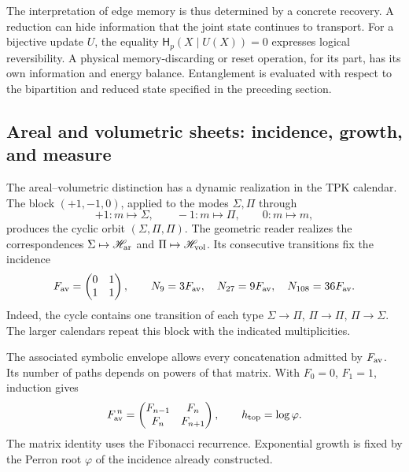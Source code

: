 The interpretation of edge memory is thus determined by
a concrete recovery. A reduction can hide information
that the joint state continues to transport. For a bijective update
\(U\), the equality \(\mathsf H_p(X\mid U(X))=0\) expresses
logical reversibility. A physical memory-discarding or reset
operation, for its part, has its own information and energy
balance. Entanglement is evaluated with respect to the bipartition and
reduced state specified in the preceding section.

\subsection{Areal and volumetric sheets: incidence, growth, and measure}
\label{sec:ii-hojas-av}

The areal--volumetric distinction has a dynamic realization in the
TPK calendar. The block \((+1,-1,0)\), applied to the modes
\(\Sigma,\Pi\) through
\[
 +1:m\mapsto\Sigma,\qquad -1:m\mapsto\Pi,\qquad 0:m\mapsto m,
\]
produces the cyclic orbit \((\Sigma,\Pi,\Pi)\). The geometric reader
realizes the correspondences \(\Sigma\mapsto\mathscr H_{\rm ar}\) and
\(\Pi\mapsto\mathscr H_{\rm vol}\). Its consecutive transitions
fix the incidence
\begin{equation}
 F_{\rm av}=\begin{pmatrix}0&1\\1&1\end{pmatrix},\qquad
 N_9=3F_{\rm av},\quad N_{27}=9F_{\rm av},\quad
 N_{108}=36F_{\rm av}.
 \label{eq:ii-hojas-incidencia}
\end{equation}
Indeed, the cycle contains one transition of each type
\(\Sigma\to\Pi\), \(\Pi\to\Pi\), \(\Pi\to\Sigma\).
The larger calendars repeat this block with the indicated
multiplicities.

The associated symbolic envelope allows every concatenation
admitted by \(F_{\rm av}\). Its number of paths depends on
powers of that matrix. With \(F_0=0\), \(F_1=1\), induction gives
\begin{equation}
 F_{\rm av}^{\,n}=
 \begin{pmatrix}F_{n-1}&F_n\\F_n&F_{n+1}\end{pmatrix},
 \qquad h_{\rm top}=\log\varphi.
 \label{eq:ii-hojas-fibonacci}
\end{equation}
The matrix identity uses the Fibonacci recurrence. Exponential
growth is fixed by the Perron root \(\varphi\) of the
incidence already constructed.

